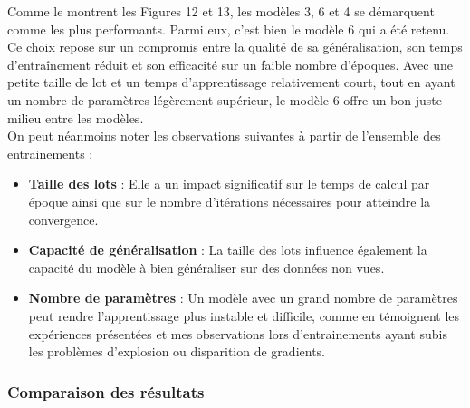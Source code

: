 \begin{multicols}{2}
Comme le montrent les Figures 12 et 13, les modèles 3, 6 et 4 se démarquent comme 
les plus performants. Parmi eux, c'est bien le modèle 6 qui a été retenu. Ce choix repose sur un 
compromis entre la qualité de sa généralisation, son temps d’entraînement réduit et 
son efficacité sur un faible nombre d’époques. Avec une petite taille de lot et un 
temps d’apprentissage relativement court, tout en ayant un nombre de paramètres 
légèrement supérieur, le modèle 6 offre un bon juste milieu entre les modèles. \\

On peut néanmoins noter les observations suivantes à partir de l'ensemble des entrainements :  
\begin{itemize}
    \item \textbf{Taille des lots} : Elle a un impact significatif sur le temps de calcul par époque ainsi que sur le nombre d’itérations nécessaires pour atteindre la convergence.  
    \item \textbf{Capacité de généralisation} : La taille des lots influence également la capacité du modèle à bien généraliser sur des données non vues.  
    \item \textbf{Nombre de paramètres} : Un modèle avec un grand nombre de paramètres peut rendre l’apprentissage plus instable et difficile, comme en témoignent les expériences présentées et mes observations lors 
    d'entrainements ayant subis les problèmes d'explosion ou disparition de gradients.
\end{itemize}



\subsubsection{Comparaison des résultats}

\end{multicols}